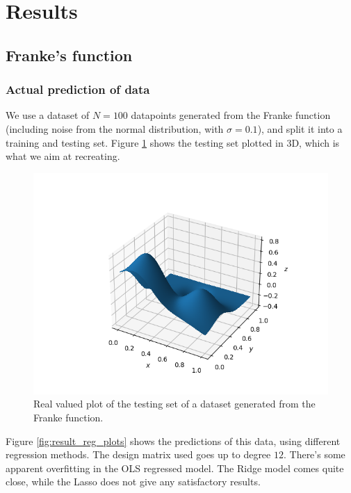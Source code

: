 \documentclass[../main.tex]{subfiles}
\begin{document}
\section{Results}\label{sec:results}
\subsection{Franke's function}
\subsubsection{Actual prediction of data}
We use a dataset of $N=100$ datapoints generated from the Franke function (including noise from the normal distribution, with $\sigma=0.1$), and split it into a training and testing set. Figure \ref{fig:result_actual_plot} shows the testing set plotted in 3D, which is what we aim at recreating.

\begin{figure}[h]
    \centering
    \includegraphics[width=\textwidth]{../assets/actual_franke_plot.png}
    \caption{Real valued plot of the testing set of a dataset generated from the Franke function.}
    \label{fig:result_actual_plot}
\end{figure}

Figure \ref{fig:result_reg_plots} shows the predictions of this data, using different regression methods. The design matrix used goes up to degree $12$. There's some apparent overfitting in the OLS regressed model. The Ridge model comes quite close, while the Lasso does not give any satisfactory results. 
\end{document}
